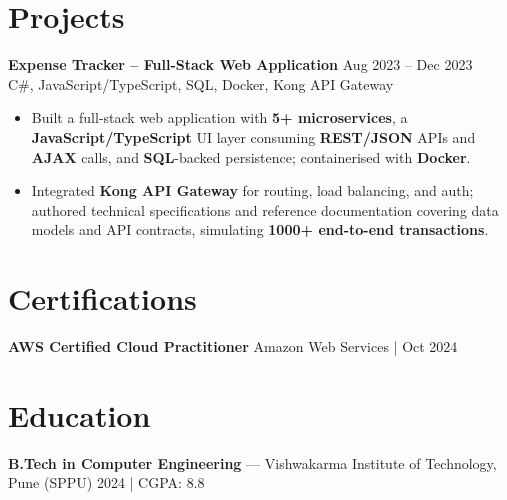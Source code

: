 \documentclass[10pt,letterpaper]{article}
\newcommand{\resumeSubheading}[4]{%
  \textbf{#1} \hfill #2 \\
  #3 \hfill #4 \\
}
\begin{document}
\section*{Projects}

\resumeSubheading{Expense Tracker -- Full-Stack Web Application}{Aug 2023 -- Dec 2023}{}{C\#, JavaScript/TypeScript, SQL, Docker, Kong API Gateway}
\begin{itemize}
    \item Built a full-stack web application with \textbf{5+ microservices}, a \textbf{JavaScript/TypeScript} UI layer consuming \textbf{REST/JSON} APIs and \textbf{AJAX} calls, and \textbf{SQL}-backed persistence; containerised with \textbf{Docker}.
    \item Integrated \textbf{Kong API Gateway} for routing, load balancing, and auth; authored technical specifications and reference documentation covering data models and API contracts, simulating \textbf{1000+ end-to-end transactions}.
\end{itemize}

\section*{Certifications}
\textbf{AWS Certified Cloud Practitioner} \hfill Amazon Web Services \;|\; Oct 2024

\section*{Education}
\textbf{B.Tech in Computer Engineering} --- Vishwakarma Institute of Technology, Pune (SPPU) \hfill 2024 \;|\; CGPA: 8.8
\end{document}

